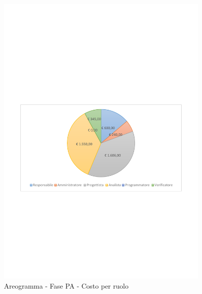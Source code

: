 \documentclass[../PianoProgetto.tex]{subfiles}
\begin{document}
	\begin{figure}[!h]
		\centering
		\includegraphics[width=0.93\textwidth , trim=2cm 9.5cm 2cm 11cm]{grafici/PA/PA-costo}
			\caption{Areogramma - Fase PA - Costo per ruolo}
		\label{fig:CircleChart-fasePA_costo}
	\end{figure}
\vfill	
\newpage
\vfill
\end{document}
